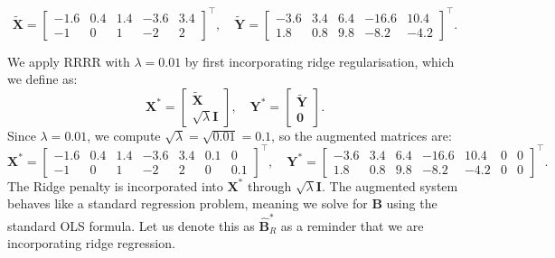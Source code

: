 \documentclass[11pt]{report} %
\begin{document}
\[
\tilde{\mathbf{X}} =
\begin{bmatrix}
-1.6  & 0.4  & 1.4  & -3.6  & 3.4 \\
-1  & 0  & 1  & -2  & 2
\end{bmatrix}^{\top},
\quad
\tilde{\mathbf{Y}} =
\begin{bmatrix}
-3.6  & 3.4  & 6.4  & -16.6  & 10.4 \\
1.8  & 0.8  & 9.8  & -8.2  & -4.2
\end{bmatrix}^{\top}.
\]

\noindent We apply RRRR with \( \lambda = 0.01 \) by first incorporating ridge regularisation, which we define as:
\[
\mathbf{X}^* =
\begin{bmatrix}
\mathbf{\tilde{X}} \\
\sqrt{\lambda} \mathbf{I}
\end{bmatrix}
, \quad
\mathbf{Y}^* =
\begin{bmatrix}
\mathbf{\tilde{Y}} \\
\mathbf{0}
\end{bmatrix}.
\]
Since \( \lambda = 0.01 \), we compute \( \sqrt{\lambda} = \sqrt{0.01} = 0.1 \), so the augmented matrices are:
\[
\mathbf{X}^* =
\begin{bmatrix}
-1.6  & 0.4  & 1.4  & -3.6  & 3.4 & 0.1 & 0\\
-1  & 0  & 1  & -2  & 2 & 0 & 0.1
\end{bmatrix}^{\top},
\quad
\mathbf{Y}^* =
\begin{bmatrix}
-3.6  & 3.4  & 6.4  & -16.6  & 10.4 & 0 & 0 \\
1.8  & 0.8  & 9.8  & -8.2  & -4.2 & 0 & 0
\end{bmatrix}^{\top}.
\]
The Ridge penalty is incorporated into \( \mathbf{X}^* \) through \( \sqrt{\lambda} \mathbf{I} \).
The augmented system behaves like a standard regression problem, meaning we solve for \( \mathbf{B} \) using the standard OLS formula. Let us denote this as $\hat{\mathbf{B}}^*_R$ as a reminder that we are incorporating ridge regression.
\end{document}
